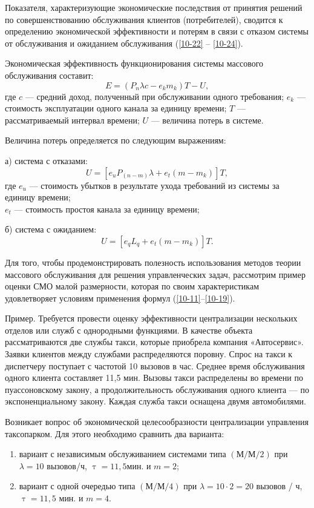 Показателя, характеризующие экономические последствия от принятия решений по совершенствованию обслуживания клиентов (потребителей), сводится к определению экономической эффективности и потерям в связи с отказом системы от обслуживания и ожиданием обслуживания (\ref{10-22} -- \ref{10-24}).

Экономическая эффективность функционирования системы массового обслуживания составит:
\begin{equation}\label{10-22}
E =(P_n\lambda c - e_k m_k)T - U,
\end{equation}
где $ c $ --- средний доход, полученный при обслуживании одного требования;
$ e_k $ --- стоимость эксплуатации одного канала за единицу времени;
$ T $ --- рассматриваемый интервал времени;
$ U $ --- величина потерь в системе.

Величина потерь определяется по следующим выражениям:

а) система с отказами:
\begin{equation}\label{10-23}
U = \left[e_u P_{(n-m)} \lambda + e_t (m - m_k)\right] T,
\end{equation}
где $ e_u $ --- стоимость убытков в результате ухода требований из системы за единицу времени;\\
$ e_t $ --- стоимость простоя канала за единицу времени;

б) система с ожиданием:
\begin{equation}\label{10-24}
U = [e_q L_q + e_t(m - m_k)] T.
\end{equation}

Для того, чтобы продемонстрировать полезность использования  методов теории массового обслуживания для решения управленческих задач, рассмотрим пример оценки СМО малой размерности, которая по своим характеристикам удовлетворяет условиям применения формул (\ref{10-11}--\ref{10-19}).

Пример. Требуется провести оценку эффективности централизации нескольких отделов или служб с однородными функциями. В качестве объекта рассматриваются две службы такси, которые приобрела компания «Автосервис». Заявки клиентов между службами распределяются поровну. Спрос на такси к диспетчеру поступает с частотой 10 вызовов в час. Среднее время обслуживания одного клиента составляет 11,5 мин. Вызовы такси распределены во времени по пуассоновскому закону, а продолжительность обслуживания одного клиента --- по экспоненциальному закону. Каждая служба такси оснащена двумя автомобилями.

Возникает вопрос об экономической целесообразности централизации управления таксопарком. Для этого необходимо сравнить два варианта:
\begin{enumerate}
	\item вариант с независимым обслуживанием системами типа $(М/М/2)$ при $\lambda = 10$ вызовов/ч, $\uptau = 11,5$мин. и $m = 2$;
	\item вариант с одной очередью типа $(М/М/4)$ при $\lambda = 10 \cdot 2 = 20$ вызовов / ч, $\uptau = 11,5$ мин. и $m = 4$.
\end{enumerate}

